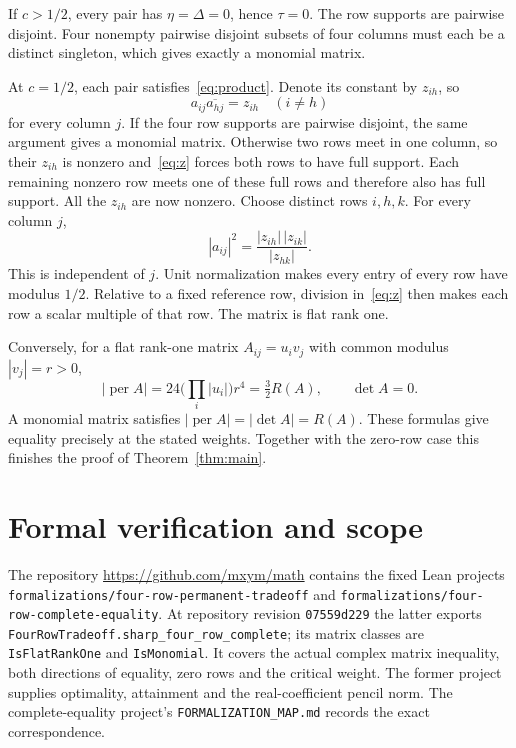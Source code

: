 \documentclass[11pt]{article}
\DeclareMathOperator{\per}{per}
\begin{document}
If $c>1/2$, every pair has $\eta=\Delta=0$, hence $\tau=0$.
The row supports are pairwise disjoint. Four nonempty pairwise disjoint
subsets of four columns must each be a distinct singleton, which gives
exactly a monomial matrix.

At $c=1/2$, each pair satisfies~\eqref{eq:product}. Denote its constant
by $z_{ih}$, so
\begin{equation}\label{eq:z}
 a_{ij}\overline{a_{hj}}=z_{ih}\quad(i\ne h)
\end{equation}
for every column $j$. If the four row supports are pairwise disjoint, the
same argument gives a monomial matrix. Otherwise two rows meet in one
column, so their $z_{ih}$ is nonzero and~\eqref{eq:z} forces both rows
to have full support. Each remaining nonzero row meets one of these full
rows and therefore also has full support. All the $z_{ih}$ are now
nonzero. Choose distinct rows $i,h,k$. For every column $j$,
\[
 |a_{ij}|^2=\frac{|z_{ih}|\,|z_{ik}|}{|z_{hk}|}.
\]
This is independent of $j$. Unit normalization makes every entry of
every row have modulus $1/2$. Relative to a fixed reference row, division
in~\eqref{eq:z} then makes each row a scalar multiple of that row.
The matrix is flat rank one.

Conversely, for a flat rank-one matrix $A_{ij}=u_i v_j$ with common
modulus $|v_j|=r>0$,
\[
 |\per A|=24\Big(\prod_i|u_i|\Big)r^4
          =\tfrac32 R(A),\qquad\det A=0.
\]
A monomial matrix satisfies $|\per A|=|\det A|=R(A)$.
These formulas give equality precisely at the stated weights.
Together with the zero-row case this finishes the proof of
Theorem~\ref{thm:main}.

\section{Formal verification and scope}
The repository \url{https://github.com/mxym/math} contains the fixed
Lean projects \nolinkurl{formalizations/four-row-permanent-tradeoff} and
\nolinkurl{formalizations/four-row-complete-equality}. At repository
revision \nolinkurl{07559d229} the latter exports
\nolinkurl{FourRowTradeoff.sharp_four_row_complete}; its matrix classes
are \texttt{IsFlatRankOne} and \texttt{IsMonomial}. It covers the actual
complex matrix inequality, both directions of equality, zero rows and
the critical weight. The former project supplies optimality, attainment
and the real-coefficient pencil norm. The complete-equality project's
\texttt{FORMALIZATION\_MAP.md} records the exact correspondence.
\end{document}
